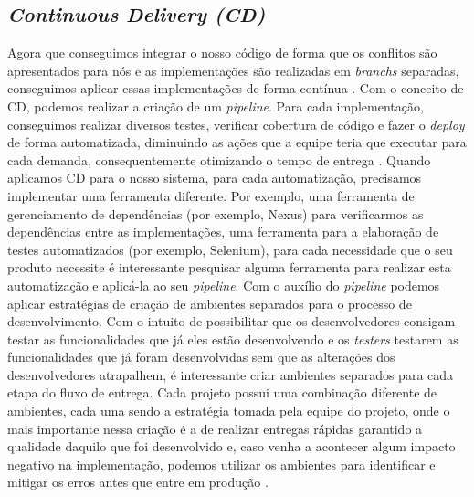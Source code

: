      \subsection{\textit{Continuous Delivery (CD)}}
        Agora que conseguimos integrar o nosso código de forma que os conflitos são
        apresentados para nós e as implementações são realizadas em \textit{branchs}
        separadas, conseguimos aplicar essas implementações de forma contínua
        \cite{TheDevOpsHandbook}. Com o conceito de CD, podemos realizar a criação
        de um \textit{pipeline}. Para cada implementação, conseguimos realizar
        diversos testes, verificar cobertura de código e fazer o \textit{deploy}
        de forma automatizada, diminuindo as ações que a equipe teria que executar
        para cada demanda, consequentemente otimizando o tempo de entrega
        \cite{ContinuousDelivery}. Quando aplicamos CD para o nosso sistema,
        para cada automatização, precisamos implementar uma ferramenta diferente.
        Por exemplo, uma ferramenta de gerenciamento de dependências (por exemplo,
        Nexus) para verificarmos as dependências entre as implementações, uma ferramenta
        para a elaboração de testes automatizados (por exemplo, Selenium), para
        cada necessidade que o seu produto necessite é interessante pesquisar alguma
        ferramenta para realizar esta automatização e aplicá-la ao seu \textit{
        pipeline}. \newline
        Com o auxílio do \textit{pipeline} podemos aplicar estratégias de criação
        de ambientes separados para o processo de desenvolvimento. Com o intuito de
        possibilitar que os desenvolvedores consigam testar as funcionalidades que
        já eles estão desenvolvendo e os \textit{testers} testarem as funcionalidades
        que já foram desenvolvidas sem que as alterações dos desenvolvedores
        atrapalhem, é interessante criar ambientes separados para cada etapa do
        fluxo de entrega. \newline
        Cada projeto possui uma combinação diferente de ambientes, cada uma sendo
        a estratégia tomada pela equipe do projeto, onde o mais importante nessa
        criação é a de realizar entregas rápidas garantido a qualidade daquilo
        que foi desenvolvido e, caso venha a acontecer algum impacto negativo na
        implementação, podemos utilizar os ambientes para identificar e mitigar
        os erros antes que entre em produção \cite{TheDevOpsHandbook}. \newline

